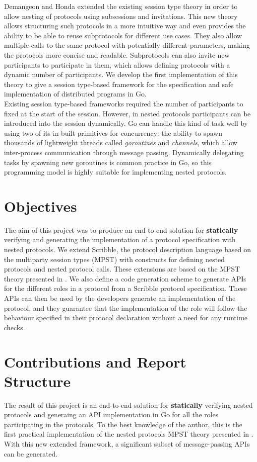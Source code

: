 \documentclass[12pt,twoside]{report}
\begin{document}
Demangeon and Honda \cite{nestedprotocols} extended the existing session type theory in order to allow nesting of protocols using subsessions and invitations. This new theory allows structuring such protocols in a more intuitive way and even provides the ability to be able to reuse subprotocols for different use cases. They also allow multiple calls to the same protocol with potentially different parameters, making the protocols more concise and readable. Subprotocols can also invite new participants to participate in them, which allows defining protocols with a dynamic number of participants. We develop the first implementation of this theory to give a session type-based framework for the specification and safe implementation of distributed programs in Go.\\

Existing session type-based frameworks required the number of participants to fixed at the start of the session. However, in nested protocols participants can be introduced into the session dynamically. Go can handle this kind of task well by using two of its in-built primitives for concurrency\cite{godocs}: the ability to spawn thousands of lightweight threads called \textit{goroutines} and \textit{channels}, which allow inter-process communication through message passing. Dynamically delegating tasks by spawning new goroutines is common practice in Go, so this programming model is highly suitable for implementing nested protocols.

\section{Objectives}
The aim of this project was to produce an end-to-end solution for \textbf{statically} verifying and generating the implementation of a protocol specification with nested protocols. We extend Scribble\cite{scribble}, the protocol description language based on the multiparty session types (MPST) with constructs for defining nested protocols and nested protocol calls. These extensions are based on the MPST theory presented in \cite{nestedprotocols}. We also define a code generation scheme to generate APIs for the different roles in a protocol from a Scribble protocol specification. These APIs can then be used by the developers generate an implementation of the protocol, and they guarantee that the implementation of the role will follow the behaviour specified in their protocol declaration without a need for any runtime checks.

\section{Contributions and Report Structure}
The result of this project is an end-to-end solution for \textbf{statically} verifying nested protocols and generaing an API implementation in Go for all the roles participating in the protocols. To the best knowledge of the author, this is the first practical implementation of the nested protocols MPST theory presented in \cite{nestedprotocols}. With this new extended framework, a significant subset of message-passing APIs can be generated.\\
\end{document}
